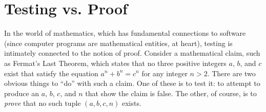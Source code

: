 \section{Testing vs. Proof}

In the world of mathematics, which has fundamental connections to
software (since computer programs are mathematical entities, at
heart), testing is intimately connected to the notion of proof.
Consider a mathematical claim, such as Fermat's Last Theorem, which
states that no three positive integers $a$, $b$, and $c$ exist that
satisfy the equation $a^n + b^n = c^n$ for any integer $n > 2$.  There
are two obvious things to ``do'' with such a claim.  One of these is
to test it:  to attempt to produce an $a$, $b$, $c$, and $n$ that show
the claim is false.  The other, of course, is to \emph{prove} that no
such tuple $(a, b, c, n)$ exists.